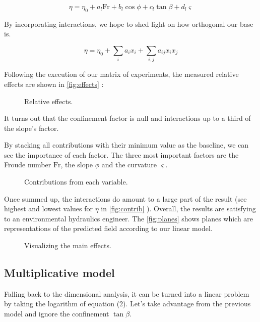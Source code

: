 \documentclass[a4paper,11pt]{article}
\begin{document}
\[\eta = \eta_0 + a_l\mathrm{Fr} + b_l\cos\phi + c_l\tan\beta + d_l\varsigma\]

By incorporating interactions, we hope to shed light on how orthogonal
our base is.

\[\eta = \eta_0 + \sum_i a_i x_i + \sum_{i,j} a_{ij} x_i x_j\]

Following the execution of our matrix of experiments, the measured
relative effects are shown in \autoref{fig:effects} :

\begin{figure}
\hypertarget{fig:effects}{%
\centering

\caption{Relative effects.}\label{fig:effects}
}
\end{figure}

It turns out that the confinement factor is null and interactions up to
a third of the slope's factor.

By stacking all contributions with their minimum value as the baseline,
we can see the importance of each factor. The three most important
factors are the Froude number \(\mathrm{Fr}\), the slope \(\phi\) and
the curvature \(\varsigma\).

\begin{figure}
\hypertarget{fig:contrib}{%
\centering

\caption{Contributions from each variable.}\label{fig:contrib}
}
\end{figure}

Once summed up, the interactions do amount to a large part of the result
(see highest and lowest values for \(\eta\) in \autoref{fig:contrib} ).
Overall, the results are satisfying to an environmental hydraulics
engineer. The \autoref{fig:planes} shows planes which are representations
of the predicted field according to our linear model.

\begin{figure}
\hypertarget{fig:planes}{%
\centering

\caption{Visualizing the main effects.}\label{fig:planes}
}
\end{figure}

\hypertarget{multiplicative-model}{%
\subsection{Multiplicative model}\label{multiplicative-model}}

Falling back to the dimensional analysis, it can be turned into a linear
problem by taking the logarithm of equation (2). Let's take advantage
from the previous model and ignore the confinement \(\tan\beta\).
\end{document}
